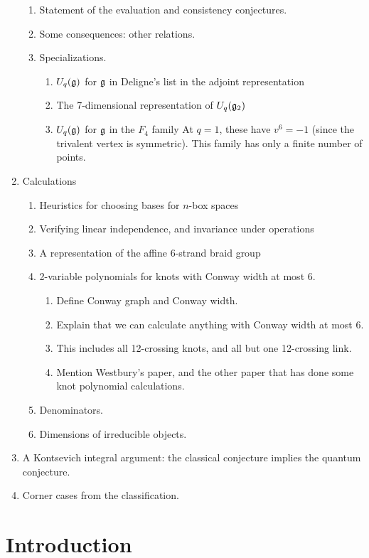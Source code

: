 \documentclass[12pt]{amsart}
\begin{document}
\begin{enumerate}
\begin{enumerate}
\item Statement of the evaluation and consistency conjectures.
\item Some consequences: other relations.
\item Specializations.
  \begin{enumerate}
  \item $U_q({\mathfrak g})$ for ${\mathfrak g}$ in Deligne's list in the adjoint
    representation
  \item The 7-dimensional representation of $U_q({\mathfrak g}_2)$
  \item $U_q({\mathfrak g})$ for ${\mathfrak g}$ in the $F_4$ family
    At $q=1$, these have $v^6=-1$ (since the trivalent vertex is
    symmetric). This family has only a finite number of points.
  \end{enumerate}
\end{enumerate}
\item Calculations
\begin{enumerate}
\item Heuristics for choosing bases for $n$-box spaces
\item Verifying linear independence, and invariance under operations
\item A representation of the affine 6-strand braid group
\item 2-variable polynomials for knots with Conway width at most 6.
\begin{enumerate}
\item Define Conway graph and Conway width.
\item Explain that we can calculate anything with Conway width at most 6.
\item This includes all 12-crossing knots, and all but one 12-crossing link.
\item Mention Westbury's paper, and the other paper that has done some knot
polynomial calculations.
\end{enumerate}
\item Denominators.
\item Dimensions of irreducible objects.
\end{enumerate}
\item A Kontsevich integral argument: the classical conjecture implies the
quantum conjecture.
\item Corner cases from the classification.
\end{enumerate}



\section{Introduction}
\label{sec:introduction}
\end{document}
